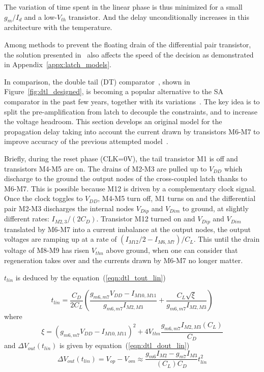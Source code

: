 The variation of time spent in the linear phase is thus minimized for a small \(g_m/I_d\) and a low-\(V_{th}\) transistor. And the delay unconditionally increases in this architecture with the temperature.

Among methods to prevent the floating drain of the differential pair transistor, the solution presented in~\cite{Montanaro1996} also affects the speed of the decision as demonstrated in Appendix~\ref{appx:latch_models}.

In comparison, the double tail (DT) comparator~\cite{Schinkel2007}, shown in Figure~\ref{fig:dtl_designed}, is becoming a popular alternative to the SA comparator in the past few years, together with its variations~\cite{Miyahara2008,Babayan2014,Khorami2016}. The key idea is to split the pre-amplification from latch to decouple the constraints, and to increase the voltage headroom. This section develops an original model for the propagation delay taking into account the current drawn by transistors M6-M7 to improve accuracy of the previous attempted model~\cite{Babayan2014}.

Briefly, during the reset phase (CLK=0V), the tail transistor M1 is off and transistors M4-M5 are on. The drains of M2-M3 are pulled up to \(V_{DD}\) which discharge to the ground the output nodes of the cross-coupled latch thanks to M6-M7. This is possible because M12 is driven by a complementary clock signal.
Once the clock toggles to \(V_{DD}\), M4-M5 turn off, M1 turns on and the differential pair M2-M3 discharges the internal nodes \(V_{Dip}\) and \(V_{Dim}\) to ground, at slightly different rates: \(I_{M2,3}/(2C_{D})\). Transistor M12 turned on and \(V_{Dip}\) and \(V_{Dim}\) translated by M6-M7 into a current imbalance at the output nodes, the output voltages are ramping up at a rate of \((I_{M12}/2-I_{M6,M7})/C_{L}\). This until the drain voltage of M8-M9 has risen \(V_{thn}\) above ground, when one can consider that regeneration takes over and the currents drawn by M6-M7 no longer matter. 

\(t_{lin}\) is deduced by the equation~(\ref{eqn:dtl_tout_lin})

\begin{equation}
\label{eqn:dtl_tout_lin}
t_{lin} = \frac{C_D}{2C_L} \left(\frac{g_{m6,m7}V_{DD}-I_{M10,M11}}{g_{m6,m7}I_{M2,M3}} + \frac{C_L\sqrt{\xi}}{g_{m6,m7}I_{M2,M3}} \right)
\end{equation}
where 
\begin{equation}
\xi = {\left(g_{m6,m7}V_{DD}-I_{M10,M11}\right)}^2  + 4V_{thn}\frac{g_{m6,m7}I_{M2,M3}(C_{L})}{C_D}
\end{equation}
and \(\Delta V_{out}(t_{lin})\) is given by equation~(\ref{eqn:dtl_dout_lin})
\begin{equation}
\label{eqn:dtl_dout_lin}
\Delta V_{out}(t_{lin}) = V_{op}-V_{om} \approx \frac{g_{m6}I_{M2}-g_{m7}I_{M3}}{(C_{L})C_D}t_{lin}^2
\end{equation}


